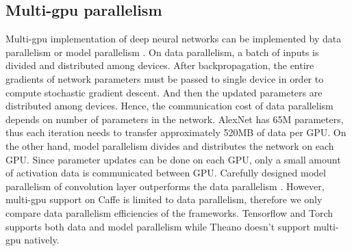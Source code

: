 \subsection{Multi-gpu parallelism}
Multi-gpu implementation of deep neural networks can be implemented by data parallelism or model parallelism \cite{NIPS2012_4687}.
On data parallelism, a batch of inputs is divided and distributed among devices.
After backpropagation, the entire gradients of network parameters must be passed to single device in order to compute stochastic gradient descent.
And then the updated parameters are distributed among devices.
Hence, the communication cost of data parallelism depends on number of parameters in the network.
AlexNet has 65M parameters, thus each iteration needs to transfer approximately 520MB of data per GPU.
On the other hand, model parallelism divides and distributes the network on each GPU.
Since parameter updates can be done on each GPU, only a small amount of activation data is communicated between GPU.
Carefully designed model parallelism of convolution layer outperforms the data parallelism \cite{DBLP:journals/corr/YadanATR13}.
However, multi-gpu support on Caffe is limited to data parallelism, therefore we only compare data parallelism efficiencies of the frameworks.
Tensorflow and Torch supports both data and model parallelism while Theano doesn’t support multi-gpu natively.

